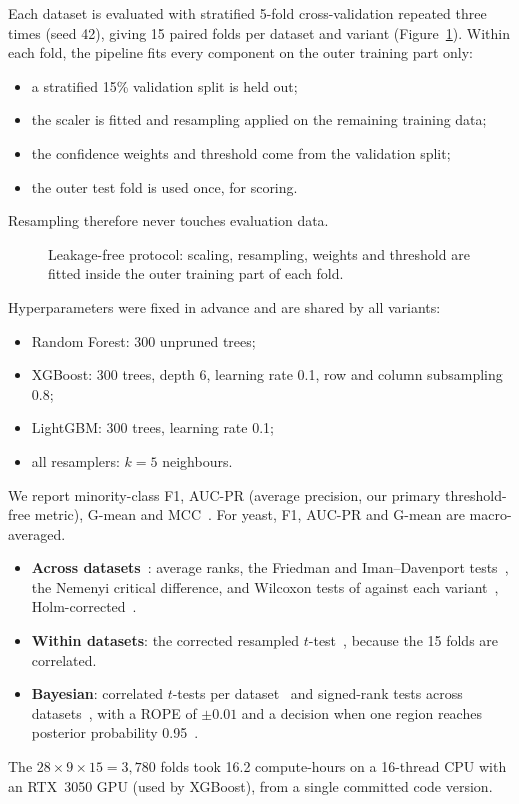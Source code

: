 Each dataset is evaluated with stratified 5-fold cross-validation repeated three times (seed 42), giving 15 paired
folds per dataset and variant (Figure~\ref{fig:protocol}). Within each fold, the pipeline fits every component on the
outer training part only:
\begin{itemize}
  \item a stratified 15\% validation split is held out;
  \item the scaler is fitted and resampling applied on the remaining training data;
  \item the confidence weights and threshold come from the validation split;
  \item the outer test fold is used once, for scoring.
\end{itemize}
Resampling therefore never touches evaluation data.

\begin{figure}
  \centering
  \resizebox{\protocolfigwidth}{!}{}
  \caption{Leakage-free protocol: scaling, resampling, weights and threshold are fitted inside the outer training
  part of each fold.}
  \label{fig:protocol}
\end{figure}

Hyperparameters were fixed in advance and are shared by all variants:
\begin{itemize}
  \item Random Forest: 300 unpruned trees;
  \item XGBoost: 300 trees, depth 6, learning rate 0.1, row and column subsampling 0.8;
  \item LightGBM: 300 trees, learning rate 0.1;
  \item all resamplers: $k=5$ neighbours.
\end{itemize}
We report minority-class F1, AUC-PR (average precision, our primary threshold-free metric), G-mean and
MCC~\cite{saito2015precision,kubat1997addressing,chicco2020advantages}. For yeast, F1, AUC-PR and G-mean are
macro-averaged.

\begin{itemize}
  \item \textbf{Across datasets}~\cite{demsar2006statistical}: average ranks, the Friedman and Iman--Davenport
        tests~\cite{friedman1937use,iman1980approximations}, the Nemenyi critical difference, and Wilcoxon tests of
        \ars{} against each variant~\cite{wilcoxon1945individual}, Holm-corrected~\cite{holm1979simple}.
  \item \textbf{Within datasets}: the corrected resampled $t$-test~\cite{nadeau2003inference,bouckaert2004evaluating},
        because the 15 folds are correlated.
  \item \textbf{Bayesian}: correlated $t$-tests per dataset~\cite{corani2015bayesian} and signed-rank tests across
        datasets~\cite{benavoli2014bayesian}, with a ROPE of $\pm0.01$ and a decision when one region reaches posterior
        probability 0.95~\cite{benavoli2017time}.
\end{itemize}

The $28\times9\times15=3{,}780$ folds took 16.2 compute-hours on a 16-thread CPU with an RTX~3050 GPU (used by
XGBoost), from a single committed code version.
